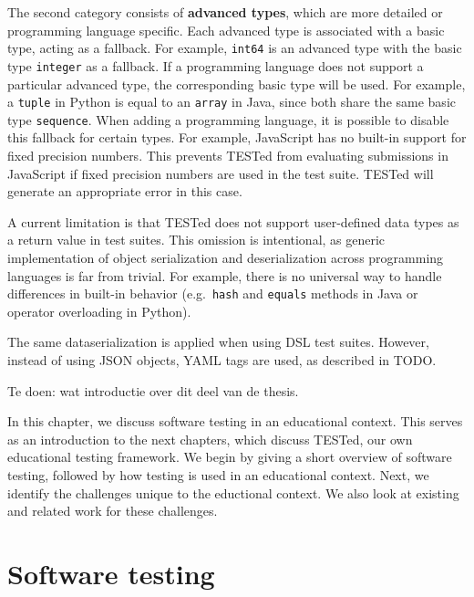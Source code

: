 \documentclass[../main]{subfiles}
\begin{document}
The second category consists of \textbf{advanced types}, which are more detailed or programming language specific.
Each advanced type is associated with a basic type, acting as a fallback.
For example, \texttt{int64} is an advanced type with the basic type \texttt{integer} as a fallback.
If a programming language does not support a particular advanced type, the corresponding basic type will be used.
For example, a \texttt{tuple} in Python is equal to an \texttt{array} in Java, since both share the same basic type \texttt{sequence}.
When adding a programming language, it is possible to disable this fallback for certain types.
For example, JavaScript has no built-in support for fixed precision numbers.
This prevents TESTed from evaluating submissions in JavaScript if fixed precision numbers are used in the test suite.
TESTed will generate an appropriate error in this case.

A current limitation is that TESTed does not support user-defined data types as a return value in test suites.
This omission is intentional, as generic implementation of object serialization and deserialization across programming languages is far from trivial.
For example, there is no universal way to handle differences in built-in behavior (e.g.\ \texttt{hash} and \texttt{equals} methods in Java or operator overloading in Python).

The same dataserialization is applied when using DSL test suites.
However, instead of using JSON objects, YAML tags are used, as described in TODO.

Te doen: wat introductie over dit deel van de thesis.

In this chapter, we discuss software testing in an educational context.
This serves as an introduction to the next chapters, which discuss TESTed, our own educational testing framework.
We begin by giving a short overview of software testing, followed by how testing is used in an educational context.
Next, we identify the challenges unique to the eductional context.
We also look at existing and related work for these challenges.

\section{Software testing}
\label{sec:software-testing}
\end{document}
